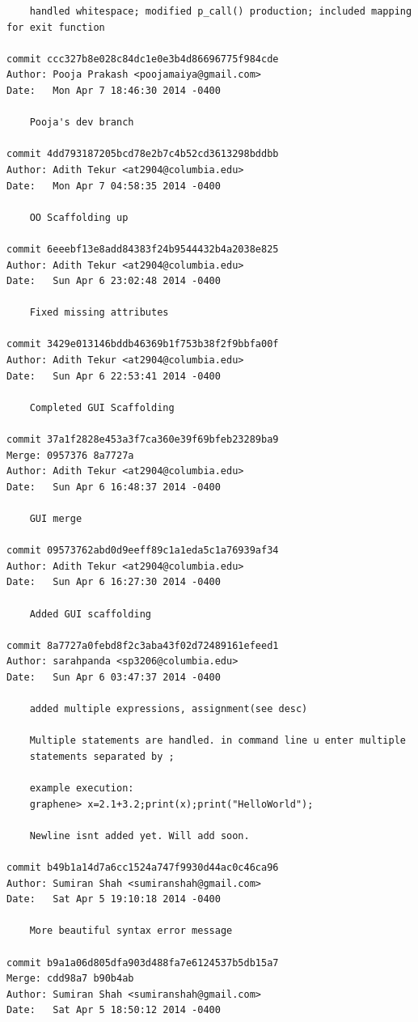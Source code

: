 \documentclass[a4paper]{article}
\begin{document}
\begin{verbatim}
    handled whitespace; modified p_call() production; included mapping for exit function

commit ccc327b8e028c84dc1e0e3b4d86696775f984cde
Author: Pooja Prakash <poojamaiya@gmail.com>
Date:   Mon Apr 7 18:46:30 2014 -0400

    Pooja's dev branch

commit 4dd793187205bcd78e2b7c4b52cd3613298bddbb
Author: Adith Tekur <at2904@columbia.edu>
Date:   Mon Apr 7 04:58:35 2014 -0400

    OO Scaffolding up

commit 6eeebf13e8add84383f24b9544432b4a2038e825
Author: Adith Tekur <at2904@columbia.edu>
Date:   Sun Apr 6 23:02:48 2014 -0400

    Fixed missing attributes

commit 3429e013146bddb46369b1f753b38f2f9bbfa00f
Author: Adith Tekur <at2904@columbia.edu>
Date:   Sun Apr 6 22:53:41 2014 -0400

    Completed GUI Scaffolding

commit 37a1f2828e453a3f7ca360e39f69bfeb23289ba9
Merge: 0957376 8a7727a
Author: Adith Tekur <at2904@columbia.edu>
Date:   Sun Apr 6 16:48:37 2014 -0400

    GUI merge

commit 09573762abd0d9eeff89c1a1eda5c1a76939af34
Author: Adith Tekur <at2904@columbia.edu>
Date:   Sun Apr 6 16:27:30 2014 -0400

    Added GUI scaffolding

commit 8a7727a0febd8f2c3aba43f02d72489161efeed1
Author: sarahpanda <sp3206@columbia.edu>
Date:   Sun Apr 6 03:47:37 2014 -0400

    added multiple expressions, assignment(see desc)
    
    Multiple statements are handled. in command line u enter multiple 
    statements separated by ;
    
    example execution:
    graphene> x=2.1+3.2;print(x);print("HelloWorld");
    
    Newline isnt added yet. Will add soon.

commit b49b1a14d7a6cc1524a747f9930d44ac0c46ca96
Author: Sumiran Shah <sumiranshah@gmail.com>
Date:   Sat Apr 5 19:10:18 2014 -0400

    More beautiful syntax error message

commit b9a1a06d805dfa903d488fa7e6124537b5db15a7
Merge: cdd98a7 b90b4ab
Author: Sumiran Shah <sumiranshah@gmail.com>
Date:   Sat Apr 5 18:50:12 2014 -0400


\end{verbatim}
\end{document}
